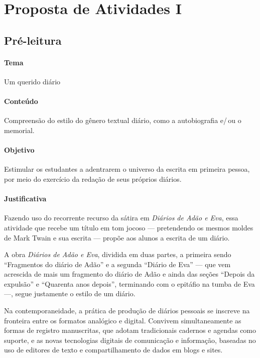 \documentclass[12pt]{extarticle}
\begin{document}
\section{Proposta de Atividades I}


\subsection{Pré-leitura}

\paragraph{Tema} Um querido diário

\paragraph{Conteúdo} Compreensão do estilo do gênero textual diário, como a autobiografia 
e/\,ou o memorial. 

\paragraph{Objetivo} Estimular os estudantes a adentrarem o universo da escrita em primeira
pessoa, por meio do exercício da redação de seus próprios diários.

\paragraph{Justificativa} Fazendo uso do recorrente recurso da sátira em 
\emph{Diários de Adão e Eva}, essa atividade que recebe um título em tom jocoso --- 
pretendendo os mesmos moldes de Mark Twain e sua escrita --- propõe aos alunos a 
escrita de um diário. 

A obra \emph{Diários de Adão e Eva}, dividida em duas partes, a primeira sendo 
``Fragmentos do diário de Adão'' e a segunda ``Diário de Eva'' ---
que vem acrescida de mais um fragmento do diário de Adão
e ainda das seções ``Depois da expulsão'' e ``Quarenta anos
depois'', terminando com o epitáfio na tumba de Eva ---, segue justamente o estilo 
de um diário.

Na contemporaneidade, a prática de produção de diários pessoais se inscreve 
na fronteira entre os formatos analógico e digital. Convivem simultaneamente 
as formas de registro manuscritas, que adotam tradicionais cadernos e agendas 
como suporte, e as novas tecnologias digitais de comunicação e informação,
baseadas no uso de editores de texto e compartilhamento de dados em
blogs e sites.
\end{document}
